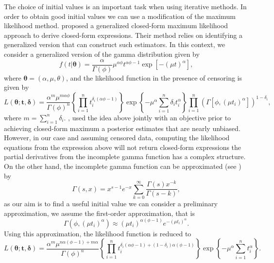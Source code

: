 \documentclass[12pt]{article} %
\newcommand{\bs}{\boldsymbol}
\theoremstyle{plain}%
\theoremstyle{definition}
\theoremstyle{remark}
\begin{document}
The choice of initial values is an important task when using iterative methods. In order to obtain good initial values we can use a modification of the maximum likelihood method. \cite{ramos2021modified} proposed a generalized closed-form maximum likelihood approach to derive closed-form expressions. Their method relies on identifying a generalized version that can construct such estimators. In this context, we consider a generalized version of the gamma distribution given by
\begin{equation*} f(t| \bs{\theta}) = \frac{\alpha}{\Gamma(\phi)} \mu^{\alpha \phi}t^{\alpha\phi-1}\exp\left[-(\mu t)^\alpha\right],
\end{equation*}
where $\bs{\theta}=(\alpha,\mu,\theta)$, and the likelihood function in the presence of censoring is given by
\begin{equation*}L(\boldsymbol{\theta; t,\delta})
=\frac{\alpha^m\mu^{m\alpha\phi}}{\Gamma(\phi)^n}\left\{\prod_{i=1}^n{t_i^{\delta_i(\alpha\phi-1)}}\right\}\exp\left\{-\mu^{\alpha}\sum_{i=1}^n {\delta_i}t_i^{\alpha}\right\}\prod_{i=1}^n\left(\Gamma[\phi,(\mu t_i)^{\alpha}]\right)^{1-\delta_i},
\end{equation*}
where $m=\sum_{i=1}^{n}\delta_i$. \cite{louzada2018efficient}, used the idea above jointly with an objective prior to achieving closed-form maximum a posterior estimates that are nearly unbiased. However, in our case and assuming censored data, computing the likelihood equations from the expression above will not return closed-form expressions the partial derivatives from the incomplete gamma function has a complex structure. On the other hand, the incomplete gamma function can be approximated (see  \cite{abramowitz}) by
\begin{equation*} \Gamma(s,x) = x^{s-1}e^{-x}\sum_{k=0}^{\infty} \frac{\Gamma(s)x^{-k}}{\Gamma(s-k)},
\end{equation*}
as our aim is to find a useful initial value we can consider a preliminary approximation, we assume the first-order approximation, that is
\begin{equation*}\Gamma(\phi,(\mu t_i)^\alpha) \approx (\mu t_i)^{\alpha(\phi-1)}e^{-(\mu t_i)^{\alpha}}.
\end{equation*}
Using this approximation, the likelihood function is reduced to
\begin{equation*}L(\bs{\theta;t,\delta})
=\frac{\alpha^m\mu^{n\alpha(\phi-1)+m\alpha}}{\Gamma(\phi)^n}\left\{\prod_{i=1}^n{t_i^{\delta_i(\alpha\phi-1)+(1-\delta_i)\alpha(\phi-1)}}\right\}\exp\left\{-\mu^{\alpha}\sum_{i=1}^n t_i^{\alpha}\right\}.
\end{equation*}
\end{document}
